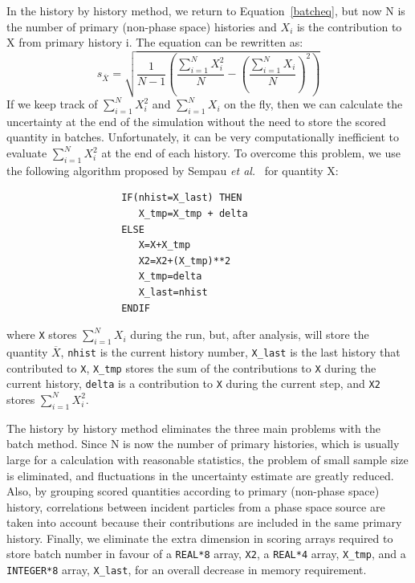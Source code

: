 \documentclass[12pt,twoside]{article}  %
\begin{document}
In the history by history method, we return to Equation~\ref{batcheq}, but
now N is the number of primary (non-phase space) histories and
$X_i$ is the contribution to X from primary history i.  The equation can
be rewritten as:
\begin{equation}
s_{\overline{X}} = \sqrt{\frac{1}{N-1}\left(\frac{\sum_{i=1}^{N}X_i^2}{N}-\left(\frac{\sum_{i=1}^{N}X_i}{N}\right)^2\right)}
\label{histeq}
\end{equation}
If we keep track of $\sum_{i=1}^{N}X_i^2$ and $\sum_{i=1}^{N}X_i$ on the fly,
then we can calculate the uncertainty at the end of the simulation without
the need to store the scored quantity in batches.  Unfortunately, 
it can be
very computationally inefficient to evaluate $\sum_{i=1}^{N}X_i^2$
at the end of each history.  To overcome this
problem, we use the following algorithm proposed by 
Sempau {\it et al.}~\cite{Se01} for quantity X:
\begin{verbatim}
                    IF(nhist=X_last) THEN
                       X_tmp=X_tmp + delta
                    ELSE
                       X=X+X_tmp
                       X2=X2+(X_tmp)**2
                       X_tmp=delta
                       X_last=nhist
                    ENDIF
\end{verbatim}
where {\tt X} stores $\sum_{i=1}^{N}X_i$ during the run, but, after analysis,
will store the quantity $\overline{X}$,
{\tt nhist} is the current history number, {\tt X\_last} is the last history
that contributed to {\tt X}, {\tt X\_tmp} stores the sum of the contributions
to {\tt X} during the current history, {\tt delta} is a contribution to
{\tt X} during the current step,
and {\tt X2} stores $\sum_{i=1}^{N}X_i^2$.

The history by history method eliminates the three main problems with the
batch method.  Since N is now the number of primary histories, which is usually
large for a calculation with reasonable statistics, the problem of small
sample size is eliminated, and fluctuations in the uncertainty estimate are
greatly reduced.   Also, by grouping scored quantities according to primary
(non-phase space) history, correlations between incident particles from
a phase space source are taken into account because their contributions are
included in the same primary history.  Finally, we eliminate the extra dimension
in scoring arrays required to store batch number in favour of 
a {\tt REAL*8} array, {\tt X2}, a {\tt REAL*4} array,
{\tt X\_tmp}, and a {\tt INTEGER*8} array, {\tt X\_last}, for an overall 
decrease in memory requirement.
\end{document}
